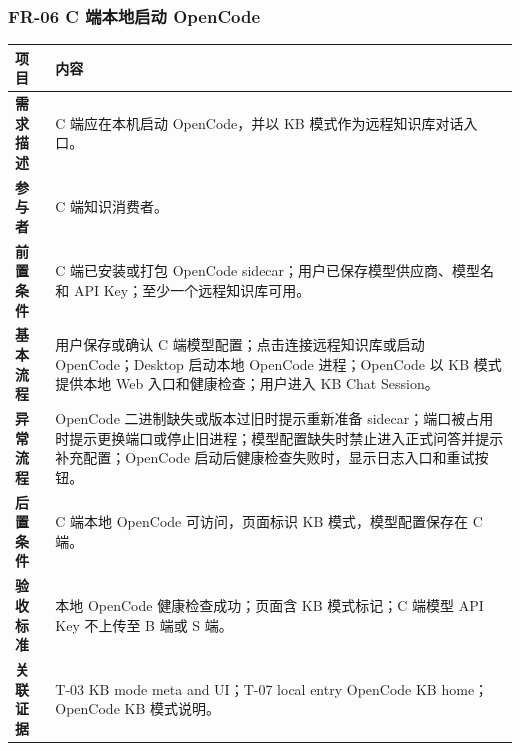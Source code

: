 \documentclass[UTF8,a4paper,12pt,fontset=fandol]{ctexart}
\begin{document}
\subsubsection{FR-06 C 端本地启动 OpenCode}
\begin{longtable}{>{\bfseries}p{2.4cm}p{11.8cm}}
\toprule
项目 & 内容 \\
\midrule
需求描述 & C 端应在本机启动 OpenCode，并以 KB 模式作为远程知识库对话入口。 \\
参与者 & C 端知识消费者。 \\
前置条件 & C 端已安装或打包 OpenCode sidecar；用户已保存模型供应商、模型名和 API Key；至少一个远程知识库可用。 \\
基本流程 & 用户保存或确认 C 端模型配置；点击连接远程知识库或启动 OpenCode；Desktop 启动本地 OpenCode 进程；OpenCode 以 KB 模式提供本地 Web 入口和健康检查；用户进入 KB Chat Session。 \\
异常流程 & OpenCode 二进制缺失或版本过旧时提示重新准备 sidecar；端口被占用时提示更换端口或停止旧进程；模型配置缺失时禁止进入正式问答并提示补充配置；OpenCode 启动后健康检查失败时，显示日志入口和重试按钮。 \\
后置条件 & C 端本地 OpenCode 可访问，页面标识 KB 模式，模型配置保存在 C 端。 \\
验收标准 & 本地 OpenCode 健康检查成功；页面含 KB 模式标记；C 端模型 API Key 不上传至 B 端或 S 端。 \\
关联证据 & T-03 KB mode meta and UI；T-07 local entry OpenCode KB home；OpenCode KB 模式说明。 \\
\bottomrule
\end{longtable}
\end{document}
